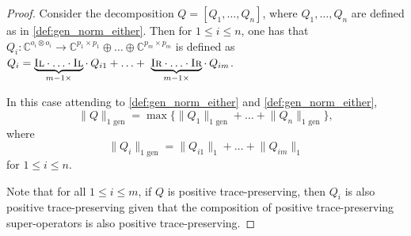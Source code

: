 \begin{proof}
  Consider the decomposition $Q = [Q_1, \ldots, Q_n]$, where $Q_1, \ldots, Q_n$ are defined as in \autoref{def:gen_norm_either}. Then for $ 1 \leq i \leq n$, one has that $Q_i: \mathbb{C}^{o_i \otimes o_i} \rightarrow  \mathbb{C}^{p_1 \times p_1} \oplus \ldots \oplus  \mathbb{C}^{p_m \times p_m}$ is defined as  $Q_i = \underbrace{\textsc{Il} \cdot \ldots \cdot \textsc{Il}}_{m-1 \times} \cdot \hspace{2pt} Q_{i1} + \ldots +  \underbrace{\textsc{Ir} \cdot \ldots \cdot \textsc{Ir}}_{m-1 \times} \cdot \hspace{2pt} Q_{im}$.

  In this case attending to \autoref{def:gen_norm_either} and \autoref{def:gen_norm_either}, 
  \begin{equation}
      \lVert Q \rVert_{1 \text{ gen}} = \max \{ \lVert Q_1 \rVert_{1  \text{ gen}} + \ldots + \lVert Q_n \rVert_{1  \text{ gen}} \},
  \end{equation}
    where
    \begin{equation} \label{eq:qi_norm}
        \lVert Q_i \rVert_{1  \text{ gen}} = \lVert Q_{i1} \rVert_{1} + \ldots + \lVert Q_{im} \rVert_{1}
    \end{equation}
for $ 1 \leq i \leq n$.

Note that for all $1 \leq i \leq m$, if $Q$ is positive trace-preserving, then $Q_i$ is also positive trace-preserving given that the composition of positive trace-preserving super-operators is also positive trace-preserving.


\end{proof}
